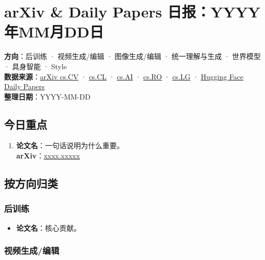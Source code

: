 
\section{arXiv \& Daily Papers 日报：YYYY年MM月DD日}

\begin{conceptbox}
\textbf{方向}：后训练 · 视频生成/编辑 · 图像生成/编辑 · 统一理解与生成 · 世界模型 · 具身智能 · Style\\
\textbf{数据来源}：\href{https://arxiv.org/list/cs.CV/new}{arXiv cs.CV} · \href{https://arxiv.org/list/cs.CL/new}{cs.CL} · \href{https://arxiv.org/list/cs.AI/new}{cs.AI} · \href{https://arxiv.org/list/cs.RO/new}{cs.RO} · \href{https://arxiv.org/list/cs.LG/new}{cs.LG} · \href{https://huggingface.co/papers}{Hugging Face Daily Papers}\\
\textbf{整理日期}：YYYY-MM-DD
\end{conceptbox}

\subsection{今日重点}

\begin{enumerate}[leftmargin=1.5em]
  \item \textbf{论文名}：一句话说明为什么重要。\\
  \textbf{arXiv}：\href{https://arxiv.org/abs/xxxx.xxxxx}{xxxx.xxxxx}
\end{enumerate}

\subsection{按方向归类}

\subsubsection{后训练}

\begin{itemize}[leftmargin=1.5em]
  \item \textbf{论文名}：核心贡献。
\end{itemize}

\subsubsection{视频生成/编辑}

